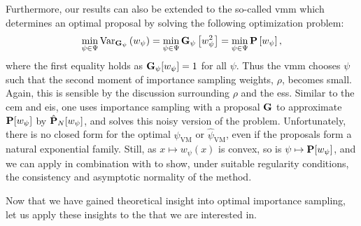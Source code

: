 Furthermore, our results can also be extended to the so-called \gls{vmm} which determines an optimal proposal by solving the following optimization problem:
$$
\min_{\psi\in\Psi} \var_{\G_{\psi}} \left( w_{\psi}  \right) = \min_{\psi \in \Psi} \G_{\psi} \left[w_{\psi}^2\right] = \min_{\psi\in\Psi} \P \left[w_{\psi} \right],
$$
where the first equality holds as $\G_{\psi}[w_{\psi}] = 1$ for all $\psi$. Thus the \acrshort{vmm} chooses $\psi$ such that the second moment of importance sampling weights, $\rho$, becomes small. Again, this is sensible by the discussion surrounding $\rho$ and the \acrshort{ess}. Similar to the \acrshort{cem} and \acrshort{eis}, one uses importance sampling with a proposal $\G$ to approximate $\P [w_{\psi}]$ by $\hat\P_{N} [w_{\psi}]$, and solves this noisy version of the problem.
Unfortunately, there is no closed form for the optimal $\psi_{\text{VM}}$ or $\hat\psi_{\text{VM}}$, even if the proposals form a natural exponential family. Still, as $x \mapsto w_{\psi}(x)$ is convex, so is $\psi \mapsto \P [w_{\psi}]$, and we can apply  in combination with  to show, under suitable regularity conditions, the consistency and asymptotic normality of the method. 

Now that we have gained theoretical insight into optimal importance sampling, let us apply these insights to the  that we are interested in.
